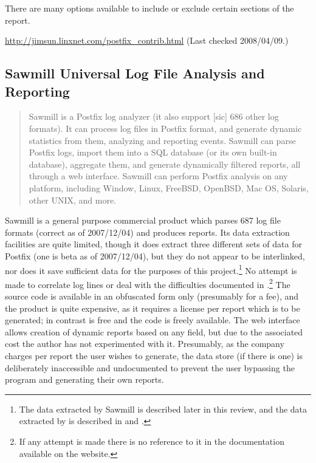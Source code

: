 There are many options available to include or exclude certain sections of
the report.

\url{http://jimsun.linxnet.com/postfix_contrib.html} \newline (Last checked
2008/04/09.)

\subsection{Sawmill Universal Log File Analysis and Reporting}

\begin{quotation}

    Sawmill is a Postfix log analyzer (it also support [sic] 686 other log
    formats).  It can process log files in Postfix format, and generate
    dynamic statistics from them, analyzing and reporting events.  Sawmill
    can parse Postfix logs, import them into a SQL database (or its own
    built-in database), aggregate them, and generate dynamically filtered
    reports, all through a web interface.  Sawmill can perform Postfix
    analysis on any platform, including Window, Linux, FreeBSD, OpenBSD,
    Mac OS, Solaris, other UNIX, and more.

\end{quotation}

Sawmill is a general purpose commercial product which parses 687 log file
formats (correct as of 2007/12/04) and produces reports.  Its data
extraction facilities are quite limited, though it does extract three
different sets of data for Postfix (one is beta as of 2007/12/04), but they
do not appear to be interlinked, nor does it save sufficient data for the
purposes of this project.\footnote{The data extracted by Sawmill is
described later in this review, and the data extracted by \PLP{} is
described in  and .}  No attempt is made to correlate log lines or deal with the
difficulties documented in 
.\footnote{If any attempt is made
there is no reference to it in the documentation available on the website.}
The source code is available in an obfuscated form only (presumably for a
fee), and the product is quite expensive, as it requires a license per
report which is to be generated; in contrast \parsername{} is free and the
code is freely available.  The web interface allows creation of dynamic
reports based on any field, but due to the associated cost the author has
not experimented with it.  Presumably, as the company charges per report
the user wishes to generate, the data store (if there is one) is
deliberately inaccessible and undocumented to prevent the user bypassing
the program and generating their own reports.

